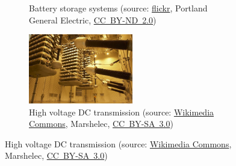 \begin{frame}[c]
\begin{figure}
\begin{subfigure}[b]{0.49\textwidth}
			\caption{Battery storage systems (source: \href{https://www.flickr.com/photos/portlandgeneralelectric/8905201835}{flickr}, 
			Portland General Electric, \href{https://creativecommons.org/licenses/by-nd/2.0/}{CC~BY-ND~2.0})}
		\end{subfigure}
		\pause
		\hfill
		\begin{subfigure}[b]{0.49\textwidth}
			\centering
			\includegraphics[width=0.5\textwidth]{fig/lec01/HVDC.jpg}
			\caption{High voltage DC transmission (source: \href{https://commons.wikimedia.org/wiki/File:Pole_2_Thyristor_Valve.jpg}{Wikimedia Commons},  	 	Marshelec, \href{https://creativecommons.org/licenses/by-sa/3.0/deed.en}{CC~BY-SA~3.0})}
		\end{subfigure}
	\end{figure}
\end{frame}

